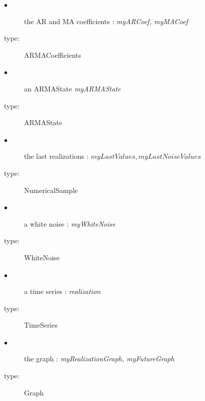  
{

  \begin{description}
  \item[$\bullet$] the AR and MA coefficients : {\itshape myARCoef, myMACoef}
  \item[type:]  ARMACoefficients
  \end{description}

  \begin{description}
  \item[$\bullet$] an ARMAState {\itshape myARMAState}
  \item[type:]  ARMAState
  \end{description}

  \begin{description}
  \item[$\bullet$] the last realizations : {\itshape $myLastValues, myLastNoiseValues$}
  \item[type:]  NumericalSample
  \end{description}

  \begin{description}
  \item[$\bullet$] a white noise : {\itshape myWhiteNoise}
  \item[type:]  WhiteNoise
  \end{description}

  \begin{description}
  \item[$\bullet$] a time series : {\itshape realization}
  \item[type:]  TimeSeries
  \end{description}

  \begin{description}
  \item[$\bullet$] the graph : {\itshape myRealizationGraph,  myFutureGraph}
  \item[type:]  Graph
  \end{description}
}

